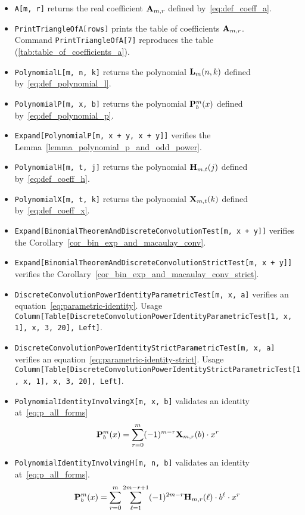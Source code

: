 \begin{itemize}
    \item \texttt{A[m, r]} returns the real coefficient ${\mathbf{A}} \sb{m,r}$ defined by~\eqref{eq:def_coeff_a}.
    \item \texttt{PrintTriangleOfA[rows]} prints the table of coefficients ${\mathbf{A}} \sb{m,r}$. \\
    Command \texttt{PrintTriangleOfA[7]} reproduces the table (\ref{tab:table_of_coefficients_a}).
    \item \texttt{PolynomialL[m, n, k]} returns the polynomial ${\mathbf{L}}\sb{m}(n,k)$ defined by~\eqref{eq:def_polynomial_l}.
    \item \texttt{PolynomialP[m, x, b]} returns the polynomial ${\mathbf{P}}\sp{m} \sb{b}(x)$ defined by~\eqref{eq:def_polynomial_p}.
    \item \texttt{Expand[PolynomialP[m, x + y, x + y]]} verifies the Lemma~\ref{lemma_polynomial_p_and_odd_power}.
    \item \texttt{PolynomialH[m, t, j]} returns the polynomial ${\mathbf{H}} \sb{m,t} (j)$ defined by~\eqref{eq:def_coeff_h}.
    \item \texttt{PolynomialX[m, t, k]} returns the polynomial ${\mathbf{X}}\sb{m,t} (k)$ defined by~\eqref{eq:def_coeff_x}.
    \item \texttt{Expand[BinomialTheoremAndDiscreteConvolutionTest[m, x + y]]} verifies the Corollary~\ref{cor_bin_exp_and_macaulay_conv}.
    \item \texttt{Expand[BinomialTheoremAndDiscreteConvolutionStrictTest[m, x + y]]} verifies the Corollary~\ref{cor_bin_exp_and_macaulay_conv_strict}.
    \item \texttt{DiscreteConvolutionPowerIdentityParametricTest[m, x, a]} verifies an equation~\eqref{eq:parametric-identity}.
    Usage \texttt{Column[Table[DiscreteConvolutionPowerIdentityParametricTest[1, x, 1], {x, 3, 20}], Left]}.
    \item \texttt{DiscreteConvolutionPowerIdentityStrictParametricTest[m, x, a]} verifies an equation~\eqref{eq:parametric-identity-strict}.
    Usage \texttt{Column[Table[DiscreteConvolutionPowerIdentityStrictParametricTest[1, x, 1], {x, 3, 20}], Left]}.
    \item \texttt{PolynomialIdentityInvolvingX[m, x, b]} validates an identity at~\eqref{eq:p_all_forms}
    \[{\mathbf{P}}\sp{m} \sb{b}(x) = \sum_{r=0}^{m} (-1)^{m-r} {\mathbf{X}}\sb{m,r} (b) \cdot x^r\]
    \item \texttt{PolynomialIdentityInvolvingH[m, n, b]} validates an identity at~\eqref{eq:p_all_forms}.
    \[{\mathbf{P}}\sp{m} \sb{b}(x) =\sum_{r=0}^{m} \sum_{\ell=1}^{2m-r+1} (-1)^{2m-r} {\mathbf{H}} \sb{m,r} (\ell) \cdot b^\ell \cdot x^r\]
\end{itemize}

